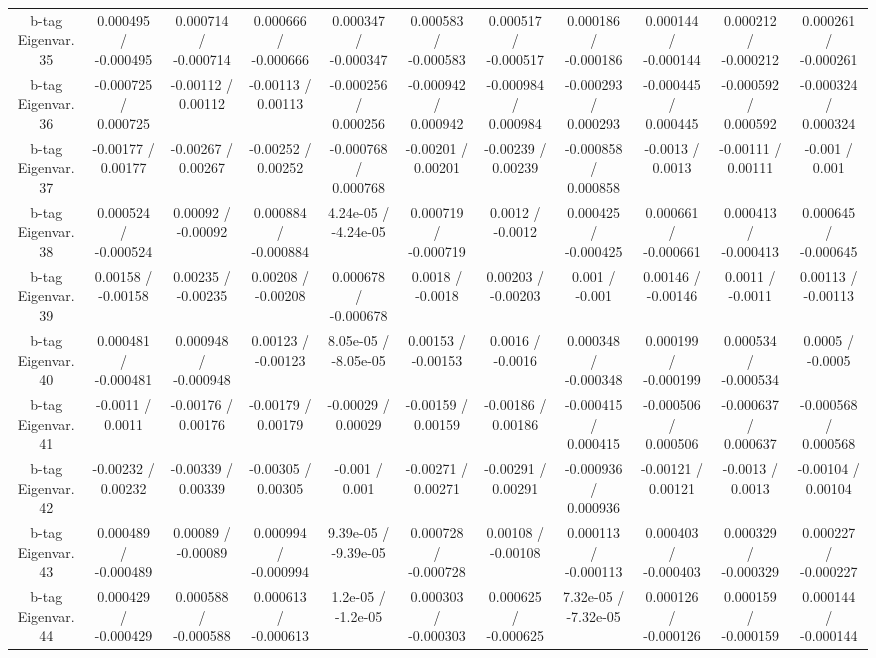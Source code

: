 \begin{table}[htbp]
\begin{center}
\begin{tabular}{|c|c|c|c|c|c|c|c|c|c|c|}
  b-tag Eigenvar. 35 & 0.000495 / -0.000495 & 0.000714 / -0.000714 & 0.000666 / -0.000666 & 0.000347 / -0.000347 & 0.000583 / -0.000583 & 0.000517 / -0.000517 & 0.000186 / -0.000186 & 0.000144 / -0.000144 & 0.000212 / -0.000212 & 0.000261 / -0.000261 \\ 
  b-tag Eigenvar. 36 & -0.000725 / 0.000725 & -0.00112 / 0.00112 & -0.00113 / 0.00113 & -0.000256 / 0.000256 & -0.000942 / 0.000942 & -0.000984 / 0.000984 & -0.000293 / 0.000293 & -0.000445 / 0.000445 & -0.000592 / 0.000592 & -0.000324 / 0.000324 \\ 
  b-tag Eigenvar. 37 & -0.00177 / 0.00177 & -0.00267 / 0.00267 & -0.00252 / 0.00252 & -0.000768 / 0.000768 & -0.00201 / 0.00201 & -0.00239 / 0.00239 & -0.000858 / 0.000858 & -0.0013 / 0.0013 & -0.00111 / 0.00111 & -0.001 / 0.001 \\ 
  b-tag Eigenvar. 38 & 0.000524 / -0.000524 & 0.00092 / -0.00092 & 0.000884 / -0.000884 & 4.24e-05 / -4.24e-05 & 0.000719 / -0.000719 & 0.0012 / -0.0012 & 0.000425 / -0.000425 & 0.000661 / -0.000661 & 0.000413 / -0.000413 & 0.000645 / -0.000645 \\ 
  b-tag Eigenvar. 39 & 0.00158 / -0.00158 & 0.00235 / -0.00235 & 0.00208 / -0.00208 & 0.000678 / -0.000678 & 0.0018 / -0.0018 & 0.00203 / -0.00203 & 0.001 / -0.001 & 0.00146 / -0.00146 & 0.0011 / -0.0011 & 0.00113 / -0.00113 \\ 
  b-tag Eigenvar. 40 & 0.000481 / -0.000481 & 0.000948 / -0.000948 & 0.00123 / -0.00123 & 8.05e-05 / -8.05e-05 & 0.00153 / -0.00153 & 0.0016 / -0.0016 & 0.000348 / -0.000348 & 0.000199 / -0.000199 & 0.000534 / -0.000534 & 0.0005 / -0.0005 \\ 
  b-tag Eigenvar. 41 & -0.0011 / 0.0011 & -0.00176 / 0.00176 & -0.00179 / 0.00179 & -0.00029 / 0.00029 & -0.00159 / 0.00159 & -0.00186 / 0.00186 & -0.000415 / 0.000415 & -0.000506 / 0.000506 & -0.000637 / 0.000637 & -0.000568 / 0.000568 \\ 
  b-tag Eigenvar. 42 & -0.00232 / 0.00232 & -0.00339 / 0.00339 & -0.00305 / 0.00305 & -0.001 / 0.001 & -0.00271 / 0.00271 & -0.00291 / 0.00291 & -0.000936 / 0.000936 & -0.00121 / 0.00121 & -0.0013 / 0.0013 & -0.00104 / 0.00104 \\ 
  b-tag Eigenvar. 43 & 0.000489 / -0.000489 & 0.00089 / -0.00089 & 0.000994 / -0.000994 & 9.39e-05 / -9.39e-05 & 0.000728 / -0.000728 & 0.00108 / -0.00108 & 0.000113 / -0.000113 & 0.000403 / -0.000403 & 0.000329 / -0.000329 & 0.000227 / -0.000227 \\ 
  b-tag Eigenvar. 44 & 0.000429 / -0.000429 & 0.000588 / -0.000588 & 0.000613 / -0.000613 & 1.2e-05 / -1.2e-05 & 0.000303 / -0.000303 & 0.000625 / -0.000625 & 7.32e-05 / -7.32e-05 & 0.000126 / -0.000126 & 0.000159 / -0.000159 & 0.000144 / -0.000144 \\ 

\end{tabular}
\end{center}
\end{table}
